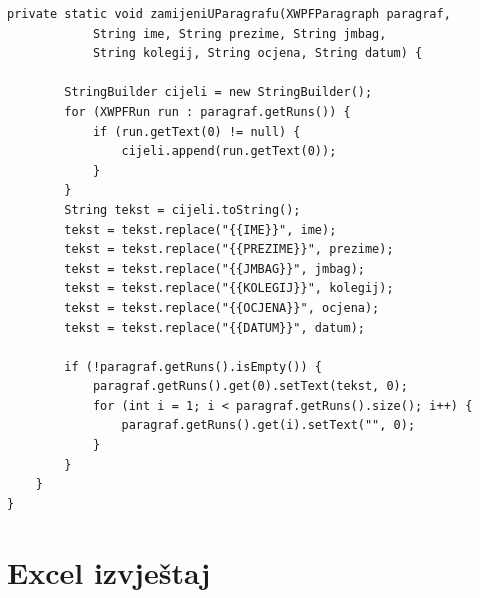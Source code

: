 \documentclass[]{foi}
\begin{document}
\begin{lstlisting}[style=Java, caption=Cirkularno pismo]
    private static void zamijeniUParagrafu(XWPFParagraph paragraf,
            String ime, String prezime, String jmbag,
            String kolegij, String ocjena, String datum) {

        StringBuilder cijeli = new StringBuilder();
        for (XWPFRun run : paragraf.getRuns()) {
            if (run.getText(0) != null) {
                cijeli.append(run.getText(0));
            }
        }
        String tekst = cijeli.toString();
        tekst = tekst.replace("{{IME}}", ime);
        tekst = tekst.replace("{{PREZIME}}", prezime);
        tekst = tekst.replace("{{JMBAG}}", jmbag);
        tekst = tekst.replace("{{KOLEGIJ}}", kolegij);
        tekst = tekst.replace("{{OCJENA}}", ocjena);
        tekst = tekst.replace("{{DATUM}}", datum);

        if (!paragraf.getRuns().isEmpty()) {
            paragraf.getRuns().get(0).setText(tekst, 0);
            for (int i = 1; i < paragraf.getRuns().size(); i++) {
                paragraf.getRuns().get(i).setText("", 0);
            }
        }
    }
}
\end{lstlisting}

\section*{Excel izvještaj}
\label{excel-izvjestaj}
\end{document}
